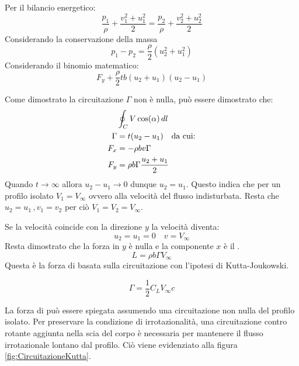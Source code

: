 Per il bilancio energetico:
\begin{equation}
\frac{p_1}{\rho} + \frac{v_1^2 + u_1^2}{2} = \frac{p_2}{\rho}+\frac{v_2^2 + u_2^2}{2}
\end{equation}
Considerando la conservazione della massa 
\begin{equation}
p_1 - p_2 = \frac{\rho}{2}(u_2^2 + u_1^2)
\end{equation}
Considerando il binomio matematico:
\begin{equation}
F_y + \frac{\rho}{2} t b (u_2 + u_1)(u_2 - u_1)
\end{equation}

Come dimostrato la circuitazione $\Gamma$ non è nulla, può essere dimostrato che:
\begin{equation}
\begin{split}
&\oint_C{V\cos(\alpha)\,dl}\\
\Gamma &= t(u_2 - u_1) \quad \textup{da cui:}\\
F_x &= -\rho bv\Gamma\\
F_y &= \rho b\Gamma \frac{u_2 + u_1}{2}
\end{split}
\end{equation}
Quando  $t \rightarrow \infty$ allora $u_2 - u_1 \rightarrow 0$ dunque $u_2 = u_1$.
Questo indica che per un profilo isolato $V_1 = V_{\infty}$ ovvero alla velocità del flusso indisturbata.
Resta che $u_2 = u_1 \, ,v_1 = v_2$ per ciò $V_1 = V_2 = V_{\infty}$.

Se la velocità coincide con la direzione $y$ la velocità diventa:
\begin{equation}
u_2 = u_1 = 0 \quad v = V_{\infty}
\end{equation}
Resta dimostrato che la forza in $y$ è nulla e la componente $x$ è il .
\begin{equation}
L = \rho b \Gamma V_{\infty}
\end{equation}
Questa è la forza di  basata sulla circuitazione con l'ipotesi di Kutta-Joukowski.

\begin{equation}
\Gamma = \frac{1}{2} C_L V_{\infty} c
\end{equation}

La forza di  può essere spiegata assumendo una circuitazione non nulla del profilo isolato. Per preservare la condizione di irrotazionalità, una circuitazione contro rotante aggiunta nella scia del corpo è necessaria per mantenere il flusso irrotazionale lontano dal profilo. Ciò viene evidenziato alla figura \ref{fig:CircuitazioneKutta}.

